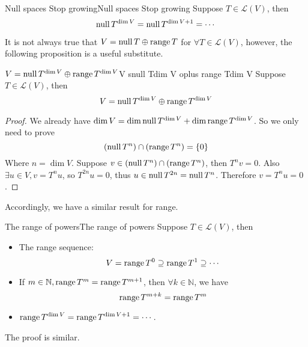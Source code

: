 \documentclass[../main.tex]{subfiles}
\begin{document}
\begin{proposition}{Null spaces Stop growing}{Null spaces Stop growing}
Suppose $T\in \mathscr{L}(V)$, then
\begin{equation*}
\operatorname{null} T^{\dim V} = \operatorname{null} T^{\dim V+1} = \cdots 
\end{equation*}
\end{proposition}

It is not always true that $V = \operatorname{null} T \oplus \operatorname{range} T$ for $\forall T\in \mathscr{L}(V)$, however, the following proposition is a useful substitute.
\begin{theorem}{$V = \operatorname{null} T^{\dim V} \oplus \operatorname{range} T^{\dim V}$}{V  snull Tdim V oplus range Tdim V}
Suppose $T\in \mathscr{L}(V)$, then
\begin{equation*}
V = \operatorname{null} T^{\dim V} \oplus \operatorname{range} T^{\dim V}
\end{equation*}
\end{theorem}
\begin{proof}
We already have $\dim V = \dim \operatorname{null} T^{\dim V} + \dim \operatorname{range} T^{\dim V}$. So we only need to prove
\begin{equation*}
	(\operatorname{null} T^n) \cap (\operatorname{range} T^n) = \left\{ 0 \right\}
\end{equation*}
Where $n = \dim V$. Suppose $v\in (\operatorname{null} T^n) \cap (\operatorname{range} T^n)$, then $T^n v=0$. Also $\exists u\in V, v = T^nu$, so $T^{2n}u=0$, thus $u\in \operatorname{null} T^{2n} = \operatorname{null} T^n$. Therefore $v = T^nu = 0$.
\end{proof}

Accordingly, we have a similar result for range.
\begin{proposition}{The range of powers}{The range of powers}
Suppose $T\in \mathscr{L}(V)$, then
\begin{itemize}
\item The range sequence:
\begin{equation*}
V = \operatorname{range} T^0 \supseteq \operatorname{range} T^1 \supseteq \cdots 
\end{equation*}
\item If $m\in \mathbb{N}, \operatorname{range} T^m = \operatorname{range} T^{m+1}$, then $\forall k\in \mathbb{N}$, we have
	\begin{equation*}
	\operatorname{range} T^{m+k} = \operatorname{range} T^m
	\end{equation*}
\item $\displaystyle \operatorname{range} T^{\dim V} = \operatorname{range} T^{\dim V+1} =\cdots $.
\end{itemize}
\end{proposition}
The proof is similar.
\end{document}
